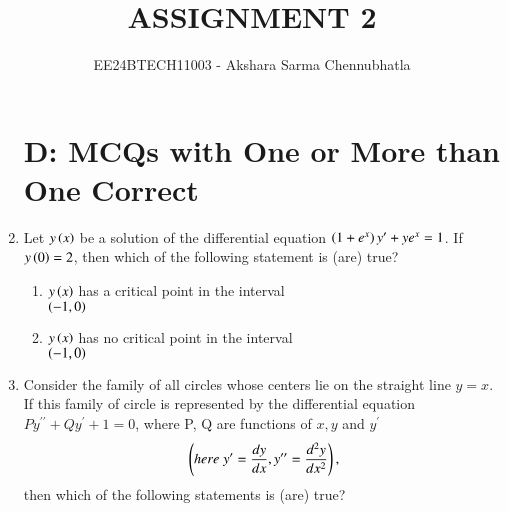 \documentclass[journal,12pt,twocolumn,article]{IEEEtran}
\theoremstyle{remark}
\begin{document}
\begin{enumerate}[start = 6]

\vspace{3cm}
\title{ASSIGNMENT 2}
\author{EE24BTECH11003 - Akshara Sarma Chennubhatla}
\maketitle
\newpage
\bigskip
\section*{D: MCQs with One or More than One Correct}
\item Let $y\left(x\right)$ be a solution of the differential equation $\left(1+e^x\right)y^\prime + ye^x = 1$. If $y\left(0\right) = 2$, then which of the following statement is (are) true?
\hfill{}
\begin{enumerate}
\item $y\left(x\right)$ has a critical point in the interval \\ $\left(-1,0\right)$
\item $y\left(x\right)$ has no critical point in the interval \\ $\left(-1,0\right)$
\end{enumerate}
\item Consider the family of all circles whose centers lie on the straight line $y = x$. If this family of circle is represented by the differential equation $Py^{\prime\prime} + Qy^\prime + 1 = 0$, where P, Q are functions of $x,y$ and $y^\prime$
\begin{align*}
\left(here\;y^\prime = \frac{dy}{dx}, y^{\prime\prime} = \frac{d^2y}{dx^2}\right),
\end{align*} then which of the following statements is (are) true?
\hfill{}
\begin{enumerate}
\end{enumerate}
\end{enumerate}
\end{document}
